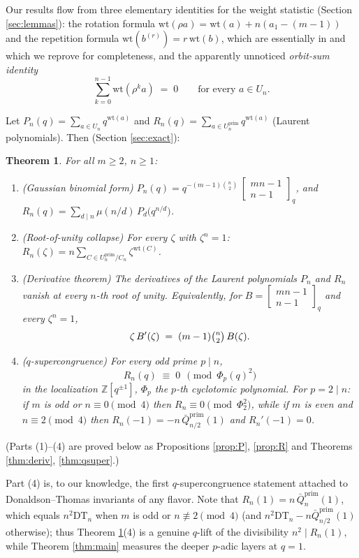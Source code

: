 \documentclass[11pt]{amsart}
\newtheorem{theorem}{Theorem}[section]
\theoremstyle{definition}
\newcommand{\ZZ}{\mathbb{Z}}
\newcommand{\DT}{\mathrm{DT}}
\newcommand{\wt}{\mathrm{wt}}
\newcommand{\prim}{\mathrm{prim}}
\newcommand{\qbin}[2]{\begin{bmatrix}#1\\#2\end{bmatrix}_q}
\begin{document}
Our results flow from three elementary identities for the weight statistic (Section \ref{sec:lemmas}): the rotation formula $\wt(\rho a)=\wt(a)+n(a_1-(m-1))$ and the repetition formula $\wt(b^{(r)})=r\,\wt(b)$, which are essentially in \cite[Lem.~6.5]{Rei1102} and which we reprove for completeness, and the apparently unnoticed \emph{orbit-sum identity}
\[
\sum_{k=0}^{n-1}\wt(\rho^k a)\;=\;0\qquad\text{for every } a\in U_n .
\]

Let $P_n(q)=\sum_{a\in U_n}q^{\wt(a)}$ and $R_n(q)=\sum_{a\in U^{\prim}_n}q^{\wt(a)}$ (Laurent polynomials). Then (Section \ref{sec:exact}):

\begin{theorem}\label{thm:q}
For all $m\ge2$, $n\ge1$:
\begin{enumerate}
\item (Gaussian binomial form) $P_n(q)=q^{-(m-1)\binom n2}\,\qbin{mn-1}{n-1}$, and
$R_n(q)=\sum_{d\mid n}\mu(n/d)\,P_d\big(q^{n/d}\big)$.
\item (Root-of-unity collapse) For every $\zeta$ with $\zeta^n=1$: $R_n(\zeta)=n\sum_{C\in U^{\prim}_n/C_n}\zeta^{\wt(C)}$.
\item (Derivative theorem) The derivatives of the Laurent polynomials $P_n$ and $R_n$ vanish at every $n$-th root of unity. Equivalently, for $B=\qbin{mn-1}{n-1}$ and every $\zeta^n=1$,
\[
\zeta\,B'(\zeta)\;=\;(m-1)\tbinom n2\,B(\zeta).
\]
\item ($q$-supercongruence) For every \emph{odd} prime $p\mid n$,
\[
R_n(q)\;\equiv\;0\ \ \pmod{\Phi_p(q)^2}
\]
in the localization $\ZZ[q^{\pm1}]$, $\Phi_p$ the $p$-th cyclotomic polynomial. For $p=2\mid n$: if $m$ is odd or $n\equiv0\pmod4$ then $R_n\equiv0\pmod{\Phi_2^2}$, while if $m$ is even and $n\equiv2\pmod 4$ then $R_n(-1)=-n\,\bar Q^{\prim}_{n/2}(1)$ and $R_n'(-1)=0$.
\end{enumerate}
\end{theorem}

\noindent(Parts (1)--(4) are proved below as Propositions \ref{prop:P}, \ref{prop:R} and Theorems \ref{thm:deriv}, \ref{thm:qsuper}.)

Part (4) is, to our knowledge, the first $q$-supercongruence statement attached to Donaldson--Thomas invariants of any flavor. Note that $R_n(1)=n\,\bar Q^{\prim}_n(1)$, which equals $n^2\DT_n$ when $m$ is odd or $n\not\equiv2\pmod4$ (and $n^2\DT_n-n\bar Q^{\prim}_{n/2}(1)$ otherwise); thus Theorem \ref{thm:q}(4) is a genuine $q$-lift of the divisibility $n^2\mid R_n(1)$, while Theorem \ref{thm:main} measures the deeper $p$-adic layers at $q=1$.
\end{document}
